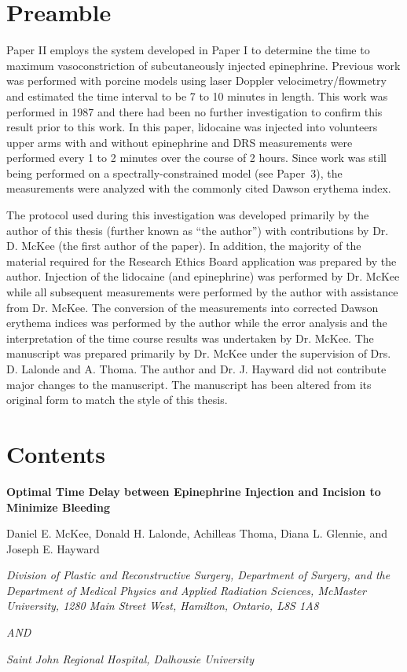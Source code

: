 \section*{Preamble}
Paper II employs the system developed in Paper I to determine the time to maximum vasoconstriction of subcutaneously injected epinephrine. Previous work was performed with porcine models using laser Doppler velocimetry/flowmetry and estimated the time interval to be 7 to 10 minutes in length.\cite{Larrabee1987} This work was performed in 1987 and there had been no further investigation to confirm this result prior to this work. In this paper, lidocaine was injected into volunteers upper arms with and without epinephrine and DRS measurements were performed every 1 to 2 minutes over the course of 2 hours. Since work was still being performed on a spectrally-constrained model (see Paper~3), the measurements were analyzed with the commonly cited Dawson erythema index.\cite{Dawson1980}

The protocol used during this investigation was developed primarily by the author of this thesis (further known as ``the author'') with contributions by Dr. D. McKee (the first author of the paper). In addition, the majority of the material required for the Research Ethics Board application was prepared by the author. Injection of the lidocaine (and epinephrine) was performed by Dr. McKee while all subsequent measurements were performed by the author with assistance from Dr. McKee. The conversion of the measurements into corrected Dawson erythema indices was performed by the author while the error analysis and the interpretation of the time course results was undertaken by Dr. McKee. The manuscript was prepared primarily by Dr. McKee under the supervision of Drs. D. Lalonde and A. Thoma. The author and Dr. J. Hayward did not contribute major changes to the manuscript. The manuscript has been altered from its original form to match the style of this thesis.

\section*{Contents}

\begin{center}

\textbf{Optimal Time Delay between Epinephrine Injection and Incision to Minimize Bleeding}

Daniel E. McKee, Donald H. Lalonde, Achilleas Thoma, Diana L. Glennie, and Joseph E. Hayward

\textit{Division of Plastic and Reconstructive Surgery, Department of Surgery, and the Department of Medical Physics and Applied Radiation Sciences, McMaster University, 1280 Main Street West, Hamilton, Ontario, L8S 1A8}

\textit{AND}

\textit{Saint John Regional Hospital, Dalhousie University}

\end{center}

